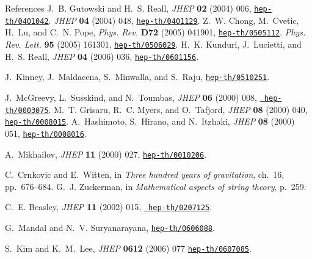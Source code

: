 \documentclass[%
ps,accumulate,
colorBG, slideColor,
total,
serpaggi
%
]{prosper}
\newcommand{\rrref}[1]{{\fontsize{8pt}{8pt}\selectfont\darkgrey #1}}
\begin{document}

\begin{slide}{References}
%
\rrref{J.~B. Gutowski and H.~S. Reall,  {\em
  JHEP} {\bf 02} (2004) 006,
\href{http://arXiv.org/abs/hep-th/0401042}{{\tt hep-th/0401042}}.
  {\em JHEP} {\bf 04} (2004) 048,
\href{http://arXiv.org/abs/hep-th/0401129}{{\tt hep-th/0401129}}.
Z.~W. Chong, M.~Cvetic, H.~Lu, and C.~N. Pope, {\em Phys.
  Rev.} {\bf D72} (2005) 041901,
\href{http://arXiv.org/abs/hep-th/0505112}{{\tt hep-th/0505112}}.
 {\em Phys.
  Rev. Lett.} {\bf 95} (2005) 161301,
\href{http://arXiv.org/abs/hep-th/0506029}{{\tt hep-th/0506029}}.
H.~K. Kunduri, J.~Lucietti, and H.~S. Reall,  {\em JHEP} {\bf 04} (2006) 036,
\href{http://arXiv.org/abs/hep-th/0601156}{{\tt hep-th/0601156}}.}

 \rrref{J.~Kinney, J.~Maldacena, S.~Minwalla, and S.~Raju,
\href{http://arXiv.org/abs/hep-th/0510251}{{\tt hep-th/0510251}}.}

\rrref{J.~McGreevy, L.~Susskind, and N.~Toumbas,  {\em JHEP} {\bf 06}
(2000) 008, \href{http://arXiv.org/abs/hep-th/0003075}{{\tt
hep-th/0003075}}.
M.~T. Grisaru, R.~C. Myers, and O.~Tafjord,  {\em JHEP}
  {\bf 08} (2000) 040,
\href{http://arXiv.org/abs/hep-th/0008015}{{\tt hep-th/0008015}}.
A.~Hashimoto, S.~Hirano, and N.~Itzhaki,  {\em JHEP} {\bf 08} (2000) 051,
\href{http://arXiv.org/abs/hep-th/0008016}{{\tt hep-th/0008016}}.}

\rrref{A.~Mikhailov,  {\em JHEP} {\bf  11} (2000) 027,
\href{http://arXiv.org/abs/hep-th/0010206}{{\tt hep-th/0010206}}.}

\rrref{C.~Crnkovic and E.~Witten, in {\em Three hundred years of gravitation},
   ch.~16, pp.~676--684.
G.~J. Zuckerman, in {\em
  Mathematical aspects of string theory},  p.~259.}

\rrref{C.~E. Beasley,  {\em JHEP} {\bf 11}
(2002) 015, \href{http://arXiv.org/abs/hep-th/0207125}{{\tt
hep-th/0207125}}.}

\rrref{G.~Mandal and N.~V. Suryanarayana,
\href{http://arXiv.org/abs/hep-th/0606088}{{\tt hep-th/0606088}}.}

\rrref{S.~Kim and K.~M.~Lee,
{\em JHEP} {\bf 0612} (2006) 077
\href{http://arXiv.org/abs/hep-th/0607085}{{\tt hep-th/0607085}}.}

%
\end{slide}
\end{document}
